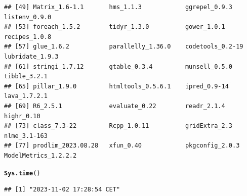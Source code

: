 \documentclass{article}\usepackage[]{graphicx}\usepackage[]{xcolor}
\makeatletter
\newcommand{\hlstd}[1]{\textcolor[rgb]{0.345,0.345,0.345}{#1}}%
\newcommand{\hlkwd}[1]{\textcolor[rgb]{0.737,0.353,0.396}{\textbf{#1}}}%
\newenvironment{kframe}{%
 \def\at@end@of@kframe{}%
 \ifinner\ifhmode%
  \def\at@end@of@kframe{\end{minipage}}%
  \begin{minipage}{\columnwidth}%
 \fi\fi%
 \def\FrameCommand##1{\hskip\@totalleftmargin \hskip-\fboxsep
 \colorbox{shadecolor}{##1}\hskip-\fboxsep
     \hskip-\linewidth \hskip-\@totalleftmargin \hskip\columnwidth}%
 \MakeFramed {\advance\hsize-\width
   \@totalleftmargin\z@ \linewidth\hsize
   \@setminipage}}%
 {\par\unskip\endMakeFramed%
 \at@end@of@kframe}
\newenvironment{knitrout}{}{} %
\makeatother
\begin{document}
\begin{knitrout}
\begin{kframe}
\begin{verbatim}
## [49] Matrix_1.6-1.1       hms_1.1.3            ggrepel_0.9.3        listenv_0.9.0       
## [53] foreach_1.5.2        tidyr_1.3.0          gower_1.0.1          recipes_1.0.8       
## [57] glue_1.6.2           parallelly_1.36.0    codetools_0.2-19     lubridate_1.9.3     
## [61] stringi_1.7.12       gtable_0.3.4         munsell_0.5.0        tibble_3.2.1        
## [65] pillar_1.9.0         htmltools_0.5.6.1    ipred_0.9-14         lava_1.7.2.1        
## [69] R6_2.5.1             evaluate_0.22        readr_2.1.4          highr_0.10          
## [73] class_7.3-22         Rcpp_1.0.11          gridExtra_2.3        nlme_3.1-163        
## [77] prodlim_2023.08.28   xfun_0.40            pkgconfig_2.0.3      ModelMetrics_1.2.2.2
\end{verbatim}
\begin{alltt}
\hlkwd{Sys.time}\hlstd{()}
\end{alltt}
\begin{verbatim}
## [1] "2023-11-02 17:28:54 CET"
\end{verbatim}
\end{kframe}
\end{knitrout}
\end{document}
